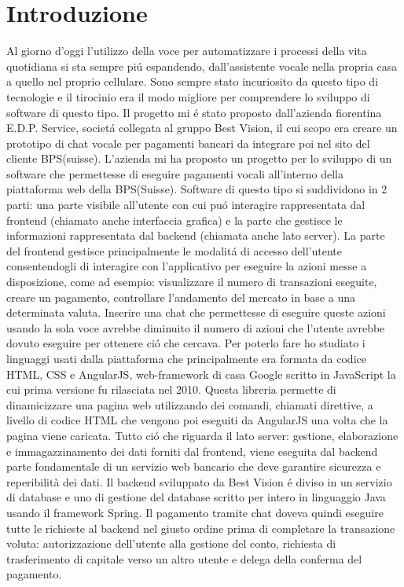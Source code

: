 \chapter{Introduzione}
Al giorno d'oggi l'utilizzo della voce per automatizzare i processi della vita quotidiana si sta sempre pi\'u espandendo, dall'assistente vocale nella propria casa a quello nel proprio cellulare. Sono sempre stato incuriosito da questo tipo di tecnologie e il tirocinio era il modo migliore per comprendere lo sviluppo di software di questo tipo. Il progetto mi \'e stato proposto dall'azienda fiorentina E.D.P. Service, societ\'a collegata al gruppo Best Vision, il cui scopo era creare un prototipo di chat vocale per pagamenti bancari da integrare poi nel sito del cliente BPS(suisse).
L'azienda mi ha proposto un progetto per lo sviluppo di un software che permettesse di eseguire pagamenti vocali all'interno della piattaforma web della BPS(Suisse).
Software di questo tipo si suddividono in 2 parti: una parte visibile all'utente con cui pu\'o interagire rappresentata dal frontend (chiamato anche interfaccia grafica) e la parte che gestisce le informazioni rappresentata dal backend (chiamata anche lato server).
La parte del frontend gestisce principalmente le modalit\'a di accesso dell'utente consentendogli di interagire con l'applicativo per eseguire la azioni messe a disposizione, come ad esempio: visualizzare il numero di transazioni eseguite, creare un pagamento, controllare l'andamento del mercato in base a una determinata valuta. Inserire una chat che permettesse di eseguire queste azioni usando la sola voce avrebbe diminuito il numero di azioni che l'utente avrebbe dovuto eseguire per ottenere ci\'o che cercava. 
Per poterlo fare ho studiato i linguaggi usati dalla piattaforma che principalmente era formata da codice HTML, CSS e AngularJS, web-framework di casa Google scritto in JavaScript la cui prima versione fu rilasciata nel 2010. Questa libreria permette di dinamicizzare una pagina web utilizzando dei comandi, chiamati direttive, a livello di codice HTML che vengono poi eseguiti da AngularJS una volta che la pagina viene caricata.
Tutto ci\'o che riguarda il lato server: gestione, elaborazione e immagazzinamento dei dati forniti dal frontend, viene eseguita dal backend parte fondamentale di un servizio web bancario che deve garantire sicurezza e reperibilità dei dati. Il backend sviluppato da Best Vision \'e diviso in un servizio di database e uno di gestione del database scritto per intero in linguaggio Java usando il framework Spring. Il pagamento tramite chat doveva quindi eseguire tutte le richieste al backend nel giusto ordine prima di completare la transazione voluta: autorizzazione dell'utente alla gestione del conto, richiesta di trasferimento di capitale verso un altro utente e delega della conferma del pagamento.
